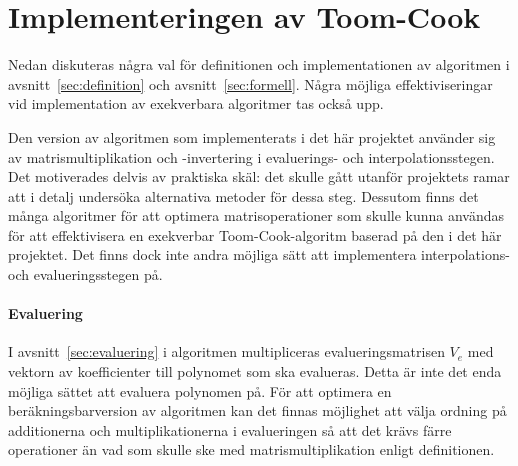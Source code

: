 \section{Implementeringen av Toom-Cook}

Nedan diskuteras några val för definitionen och implementationen av algoritmen i
avsnitt~\ref{sec:definition} och avsnitt~\ref{sec:formell}. Några möjliga
effektiviseringar vid implementation av exekverbara algoritmer tas också upp.

Den version av algoritmen som implementerats i det här projektet använder sig av
matrismultiplikation och -invertering i evaluerings- och interpolationsstegen.
Det motiverades delvis av praktiska skäl: det skulle gått utanför projektets
ramar att i detalj undersöka alternativa metoder för dessa steg.
Dessutom finns det många algoritmer för att optimera matrisoperationer som skulle kunna
användas för att effektivisera en exekverbar Toom-Cook-algoritm baserad på den i det här
projektet. Det finns dock inte andra möjliga sätt att implementera interpolations- och
evalueringsstegen på.




\paragraph{Evaluering}
I avsnitt~\ref{sec:evaluering} i algoritmen multipliceras
evalueringsmatrisen $V_e$ med vektorn av koefficienter till polynomet som ska
evalueras. Detta är inte det enda möjliga sättet att evaluera polynomen på.
För att optimera en beräkningsbarversion av algoritmen kan det finnas möjlighet att
välja ordning på additionerna och multiplikationerna i evalueringen så att det
krävs färre operationer än vad som skulle ske med matrismultiplikation enligt
definitionen\cite{bodrato2007towards}.

